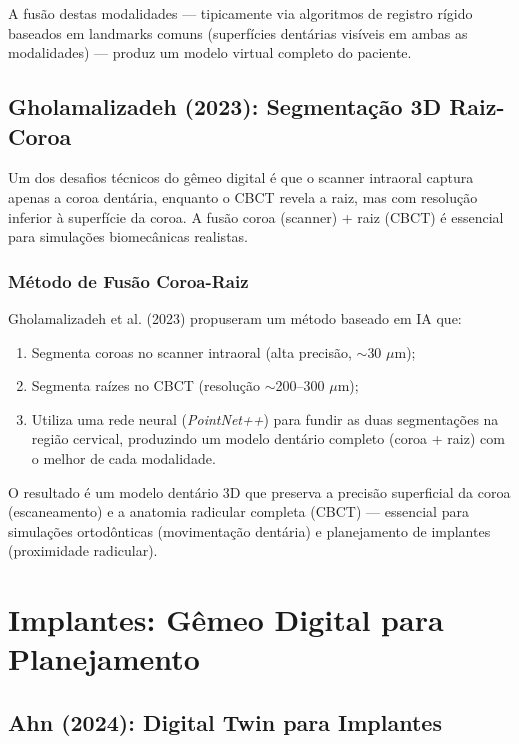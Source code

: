 A fusão destas modalidades --- tipicamente via algoritmos de registro rígido baseados em landmarks comuns (superfícies dentárias visíveis em ambas as modalidades) --- produz um modelo virtual completo do paciente.

\subsection{Gholamalizadeh (2023): Segmentação 3D Raiz-Coroa}

Um dos desafios técnicos do gêmeo digital é que o scanner intraoral captura apenas a coroa dentária, enquanto o CBCT revela a raiz, mas com resolução inferior à superfície da coroa. A fusão coroa (scanner) + raiz (CBCT) é essencial para simulações biomecânicas realistas.

\subsubsection{Método de Fusão Coroa-Raiz}

Gholamalizadeh et al. (2023) propuseram um método baseado em IA que:
\begin{enumerate}
    \item Segmenta coroas no scanner intraoral (alta precisão, $\sim$30 $\mu$m);
    \item Segmenta raízes no CBCT (resolução $\sim$200--300 $\mu$m);
    \item Utiliza uma rede neural (\textit{PointNet++}) para fundir as duas segmentações na região cervical, produzindo um modelo dentário completo (coroa + raiz) com o melhor de cada modalidade.
\end{enumerate}

O resultado é um modelo dentário 3D que preserva a precisão superficial da coroa (escaneamento) e a anatomia radicular completa (CBCT) --- essencial para simulações ortodônticas (movimentação dentária) e planejamento de implantes (proximidade radicular).

\section{Implantes: Gêmeo Digital para Planejamento}

\subsection{Ahn (2024): Digital Twin para Implantes}

